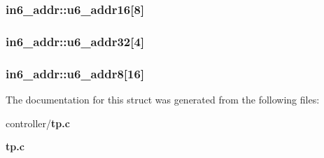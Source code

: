 \subsubsection[{u6\_\-addr16}]{ {\bf in6\_\-addr::u6\_\-addr16}[8]}\label{structin6__addr_a1f3ebc758d74bbaab646ca264294319c}
\subsubsection[{u6\_\-addr32}]{ {\bf in6\_\-addr::u6\_\-addr32}[4]}\label{structin6__addr_ae3e70c9efe012b99d63b15812a7b4a33}
\subsubsection[{u6\_\-addr8}]{ {\bf in6\_\-addr::u6\_\-addr8}[16]}\label{structin6__addr_a773aae7b7748d569975db356efd989e3}


The documentation for this struct was generated from the following files:\begin{DoxyCompactItemize}
\item 
controller/{\bf tp.c}\item 
{\bf tp.c}\end{DoxyCompactItemize}
